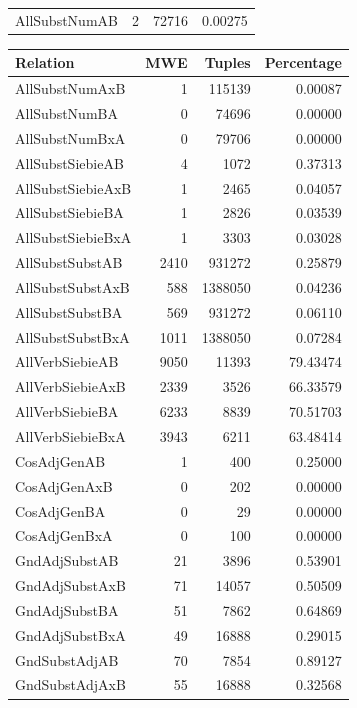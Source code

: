 \begin{table}[t]
\begin{tabular}{|l|r|r|r|}
        AllSubstNumAB & 2 & 72716 & 0.00275 \\
        \end{tabular}
        \quad
        \begin{tabular}{|l|r|r| r|}
        \hline 
        \textbf{Relation} & \textbf{MWE} & \textbf{Tuples} & \textbf{Percentage} \\
        \hline
        AllSubstNumAxB & 1 & 115139 & 0.00087 \\
        AllSubstNumBA & 0 & 74696 & 0.00000 \\
        AllSubstNumBxA & 0 & 79706 & 0.00000 \\
        AllSubstSiebieAB & 4 & 1072 & 0.37313 \\
        AllSubstSiebieAxB & 1 & 2465 & 0.04057 \\
        AllSubstSiebieBA & 1 & 2826 & 0.03539 \\
        AllSubstSiebieBxA & 1 & 3303 & 0.03028 \\
        AllSubstSubstAB & 2410 & 931272 & 0.25879 \\
        AllSubstSubstAxB & 588 & 1388050 & 0.04236 \\
        AllSubstSubstBA & 569 & 931272 & 0.06110 \\
        AllSubstSubstBxA & 1011 & 1388050 & 0.07284 \\
        AllVerbSiebieAB & 9050 & 11393 & 79.43474 \\
        AllVerbSiebieAxB & 2339 & 3526 & 66.33579 \\
        AllVerbSiebieBA & 6233 & 8839 & 70.51703 \\
        AllVerbSiebieBxA & 3943 & 6211 & 63.48414 \\
        CosAdjGenAB & 1 & 400 & 0.25000 \\
        CosAdjGenAxB & 0 & 202 & 0.00000 \\
        CosAdjGenBA & 0 & 29 & 0.00000 \\
        CosAdjGenBxA & 0 & 100 & 0.00000 \\
        GndAdjSubstAB & 21 & 3896 & 0.53901 \\
        GndAdjSubstAxB & 71 & 14057 & 0.50509 \\
        GndAdjSubstBA & 51 & 7862 & 0.64869 \\
        GndAdjSubstBxA & 49 & 16888 & 0.29015 \\
        GndSubstAdjAB & 70 & 7854 & 0.89127 \\
        GndSubstAdjAxB & 55 & 16888 & 0.32568 \\

\end{tabular}
\end{table}
